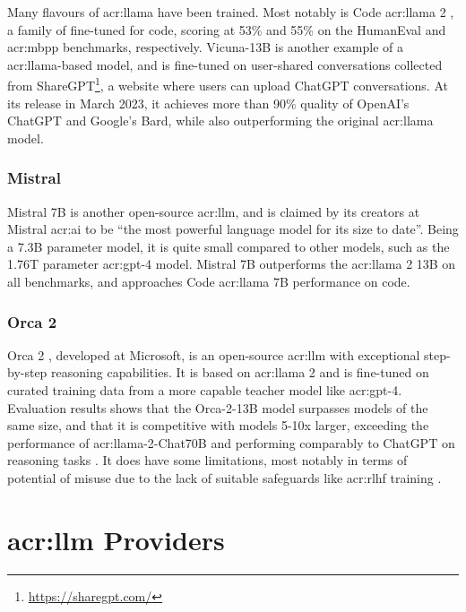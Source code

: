 Many flavours of \acrshort{acr:llama} have been trained. Most notably is Code \acrshort{acr:llama} 2 \citep{roziereCodeLlamaOpen2023}, a family of  fine-tuned for code, scoring at 53\% and 55\% on the HumanEval and \gls{acr:mbpp} benchmarks, respectively. Vicuna-13B is another example of a \acrshort{acr:llama}-based model, and is fine-tuned on user-shared conversations collected from ShareGPT\footnote{\url{https://sharegpt.com/}}, a website where users can upload ChatGPT conversations. At its release in March 2023, it achieves more than 90\% quality of OpenAI's ChatGPT and Google's Bard, while also outperforming the original \acrshort{acr:llama} model.

\subsubsection{Mistral}

Mistral 7B \citep{mistralaiMistral7B2023} is another open-source \acrshort{acr:llm}, and is claimed by its creators at Mistral \acrshort{acr:ai} to be \enquote{the most powerful language model for its size to date}. Being a 7.3B parameter model, it is quite small compared to other models, such as the 1.76T parameter \acrshort{acr:gpt}-4 model. Mistral 7B outperforms the \acrshort{acr:llama} 2 13B on all benchmarks, and approaches Code \acrshort{acr:llama} 7B performance on code.

\subsubsection{Orca 2}

Orca 2 \citep{mitraOrcaTeachingSmall2023}, developed at Microsoft, is an open-source \acrshort{acr:llm} with exceptional step-by-step reasoning capabilities. It is based on \acrshort{acr:llama} 2 and is fine-tuned on curated training data from a more capable teacher model like \acrshort{acr:gpt}-4. Evaluation results shows that the Orca-2-13B model surpasses models of the same size, and that it is competitive with models 5-10x larger, exceeding the performance of \acrshort{acr:llama}-2-Chat70B and performing comparably to ChatGPT on reasoning tasks \citep[11-12]{mitraOrcaTeachingSmall2023}. It does have some limitations, most notably in terms of potential of misuse due to the lack of suitable safeguards like \gls{acr:rlhf} training \citep[21]{mitraOrcaTeachingSmall2023}.



\section[LLM providers]{\acrlong{acr:llm} Providers}\label{sec:llm-providers}

